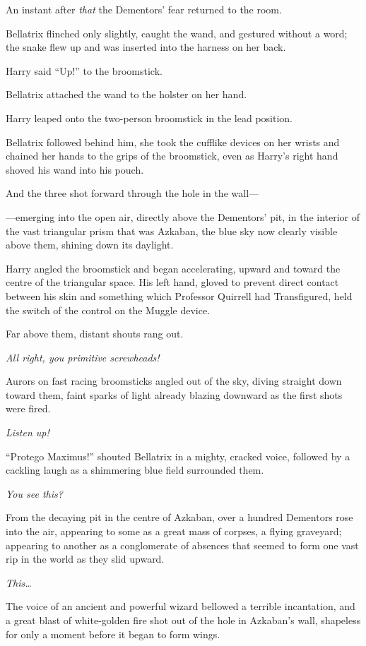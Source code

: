An instant after \emph{that} the Dementors’ fear returned to the room.

Bellatrix flinched only slightly, caught the wand, and gestured without a word; the snake flew up and was inserted into the harness on her back.

Harry said “Up!” to the broomstick.

Bellatrix attached the wand to the holster on her hand.

Harry leaped onto the two-person broomstick in the lead position.

Bellatrix followed behind him, she took the cufflike devices on her wrists and chained her hands to the grips of the broomstick, even as Harry’s right hand shoved his wand into his pouch.

And the three shot forward through the hole in the wall—

—emerging into the open air, directly above the Dementors’ pit, in the interior of the vast triangular prism that was Azkaban, the blue sky now clearly visible above them, shining down its daylight.

Harry angled the broomstick and began accelerating, upward and toward the centre of the triangular space. His left hand, gloved to prevent direct contact between his skin and something which Professor Quirrell had Transfigured, held the switch of the control on the Muggle device.

Far above them, distant shouts rang out.

\emph{All right, you primitive screwheads!}

Aurors on fast racing broomsticks angled out of the sky, diving straight down toward them, faint sparks of light already blazing downward as the first shots were fired.

\emph{Listen up!}

“Protego Maximus!” shouted Bellatrix in a mighty, cracked voice, followed by a cackling laugh as a shimmering blue field surrounded them.

\emph{You see this?}

From the decaying pit in the centre of Azkaban, over a hundred Dementors rose into the air, appearing to some as a great mass of corpses, a flying graveyard; appearing to another as a conglomerate of absences that seemed to form one vast rip in the world as they slid upward.

\emph{This…}

The voice of an ancient and powerful wizard bellowed a terrible incantation, and a great blast of white-golden fire shot out of the hole in Azkaban’s wall, shapeless for only a moment before it began to form wings.

